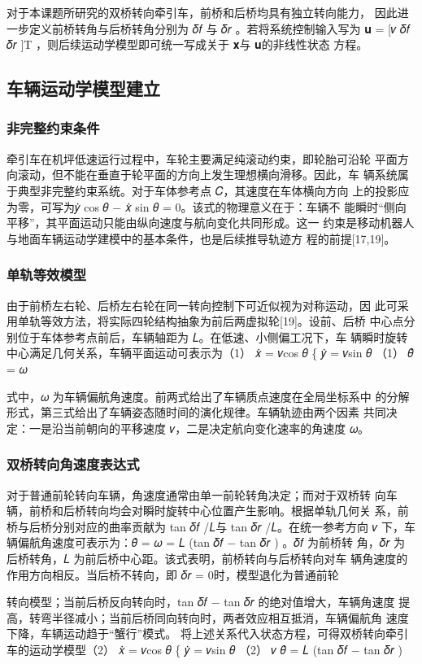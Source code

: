 对于本课题所研究的双桥转向牵引车，前桥和后桥均具有独立转向能力，
因此进一步定义前桥转角与后桥转角分别为 𝛿𝑓 与 𝛿𝑟 。若将系统控制输入写为
𝐮 = [𝑣   𝛿𝑓   𝛿𝑟 ]T ，则后续运动学模型即可统一写成关于 𝐱与 𝐮的非线性状态
方程。
\subsection{车辆运动学模型建立}
\subsubsection{非完整约束条件}
牵引车在机坪低速运行过程中，车轮主要满足纯滚动约束，即轮胎可沿轮
平面方向滚动，但不能在垂直于轮平面的方向上发生理想横向滑移。因此，车
辆系统属于典型非完整约束系统。对于车体参考点 𝐶，其速度在车体横向方向
上的投影应为零，可写为𝑦̇ cos 𝜃 − 𝑥̇ sin 𝜃 = 0。该式的物理意义在于：车辆不
能瞬时“侧向平移”，其平面运动只能由纵向速度与航向变化共同形成。这一
约束是移动机器人与地面车辆运动学建模中的基本条件，也是后续推导轨迹方
程的前提[17,19]。
\subsubsection{单轨等效模型}
由于前桥左右轮、后桥左右轮在同一转向控制下可近似视为对称运动，因
此可采用单轨等效方法，将实际四轮结构抽象为前后两虚拟轮[19]。设前、后桥
中心点分别位于车体参考点前后，车辆轴距为 𝐿。在低速、小侧偏工况下，车
辆瞬时旋转中心满足几何关系，车辆平面运动可表示为（1）
𝑥̇ = 𝑣cos 𝜃
\{ 𝑦̇ = 𝑣sin 𝜃                     （1）
𝜃̇ = 𝜔

式中，𝜔 为车辆偏航角速度。前两式给出了车辆质点速度在全局坐标系中
的分解形式，第三式给出了车辆姿态随时间的演化规律。车辆轨迹由两个因素
共同决定：一是沿当前朝向的平移速度 𝑣，二是决定航向变化速率的角速度
𝜔。
\subsubsection{双桥转向角速度表达式}
对于普通前轮转向车辆，角速度通常由单一前轮转角决定；而对于双桥转
向车辆，前桥和后桥转向均会对瞬时旋转中心位置产生影响。根据单轨几何关
系，前桥与后桥分别对应的曲率贡献为 tan 𝛿𝑓 /𝐿与 tan 𝛿𝑟 /𝐿。在统一参考方向
𝑣
下，车辆偏航角速度可表示为：𝜃̇ = 𝜔 = 𝐿 (tan 𝛿𝑓 − tan 𝛿𝑟 ) 。𝛿𝑓 为前桥转
角，𝛿𝑟 为后桥转角，𝐿 为前后桥中心距。该式表明，前桥转向与后桥转向对车
辆角速度的作用方向相反。当后桥不转向，即 𝛿𝑟 = 0时，模型退化为普通前轮






转向模型；当前后桥反向转向时，tan 𝛿𝑓 − tan 𝛿𝑟 的绝对值增大，车辆角速度
提高，转弯半径减小；当前后桥同向转向时，两者效应相互抵消，车辆偏航角
速度下降，车辆运动趋于“蟹行”模式。
将上述关系代入状态方程，可得双桥转向牵引车的运动学模型（2）
𝑥̇ = 𝑣cos 𝜃
\{       𝑦̇ = 𝑣sin 𝜃            （2）
𝑣
𝜃̇ = 𝐿 (tan 𝛿𝑓 − tan 𝛿𝑟 )



